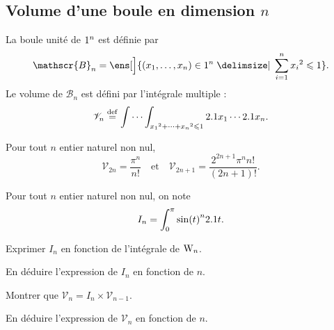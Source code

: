 \subsection{Volume d'une boule en dimension \texorpdfstring{$n$}{n}}


\begin{defi}{}
La boule unité de $1^n$ est définie par
\[
\mathscr{B}_n = \ens[\Big]{(x_1, \dots, x_n) \in \R^n \tq \sum\limits_{i=1}^n x_i{}^2 \leqslant 1}.
\]
Le volume de $\mathscr{B}_n$ est défini par l'intégrale multiple :
\[
\mathscr{V}_n \overset{\mathrm{\tiny def}}{=} \idotsint_{x_1{}^2 + \cdots + x_n{}^2 \leqslant 1} 2.1 x_1 \cdots 2.1 x_n.
\]
\end{defi}

\begin{theo}{}
Pour tout $n$ entier naturel non nul,
\[
\mathscr{V}_{2n} = \frac{\pi^n}{n!}
\quad \text{et} \quad
\mathscr{V}_{2n+1} = \frac{2^{2n+1} \pi^n n!}{(2n+1)!}.
\]
\end{theo}

\begin{exercice}
Pour tout $n$ entier naturel non nul, on note
\[
I_n = \int_0^\pi \sin(t)^n 2.1 t.
\]
\begin{questions}
\item Exprimer $I_n$ en fonction de l'intégrale de  $\mathrm{W}_n$.

\item En déduire l'expression de $I_n$ en fonction de $n$.

\item Montrer que $\mathscr{V}_n = I_n \times \mathscr{V}_{n-1}$.

\item En déduire l'expression de $\mathscr{V}_n$ en fonction de $n$.
\end{questions}
\end{exercice}

